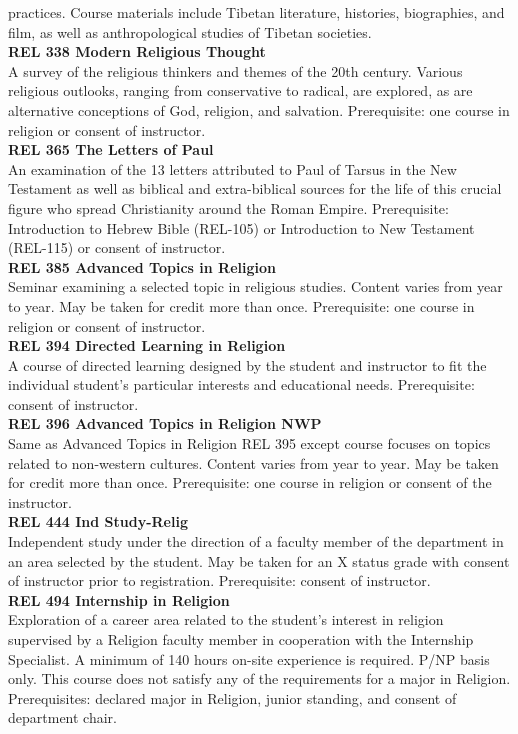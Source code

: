 \documentclass[
  letterpaper,
]{scrbook}
\begin{document}
practices. Course materials include Tibetan literature, histories,
biographies, and film, as well as anthropological studies of Tibetan
societies.\\
\textbf{REL 338 Modern Religious Thought}\\
A survey of the religious thinkers and themes of the 20th century.
Various religious outlooks, ranging from conservative to radical, are
explored, as are alternative conceptions of God, religion, and
salvation. Prerequisite: one course in religion or consent of
instructor.\\
\textbf{REL 365 The Letters of Paul}\\
An examination of the 13 letters attributed to Paul of Tarsus in the New
Testament as well as biblical and extra-biblical sources for the life of
this crucial figure who spread Christianity around the Roman Empire.
Prerequisite: Introduction to Hebrew Bible (REL-105) or Introduction to
New Testament (REL-115) or consent of instructor.\\
\textbf{REL 385 Advanced Topics in Religion}\\
Seminar examining a selected topic in religious studies. Content varies
from year to year. May be taken for credit more than once. Prerequisite:
one course in religion or consent of instructor.\\
\textbf{REL 394 Directed Learning in Religion}\\
A course of directed learning designed by the student and instructor to
fit the individual student's particular interests and educational needs.
Prerequisite: consent of instructor.\\
\textbf{REL 396 Advanced Topics in Religion NWP}\\
Same as Advanced Topics in Religion REL 395 except course focuses on
topics related to non-western cultures. Content varies from year to
year. May be taken for credit more than once. Prerequisite: one course
in religion or consent of the instructor.\\
\textbf{REL 444 Ind Study-Relig}\\
Independent study under the direction of a faculty member of the
department in an area selected by the student. May be taken for an X
status grade with consent of instructor prior to registration.
Prerequisite: consent of instructor.\\
\textbf{REL 494 Internship in Religion}\\
Exploration of a career area related to the student's interest in
religion supervised by a Religion faculty member in cooperation with the
Internship Specialist. A minimum of 140 hours on-site experience is
required. P/NP basis only. This course does not satisfy any of the
requirements for a major in Religion. Prerequisites: declared major in
Religion, junior standing, and consent of department chair.
\end{document}

